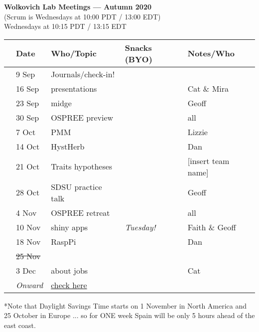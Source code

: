 \documentclass[11pt]{article}
\begin{document}
 
\raggedright
{}

\begin{center} 
{\large \textbf{Wolkovich Lab Meetings --- Autumn 2020}} \\ [2pt]
(Scrum is Wednesdays at 10:00 PDT / 13:00 EDT)\\
Wednesdays at 10:15 PDT / 13:15 EDT \\
\end{center} 

\begin{center}
\begin{tabular}{ p{0.2 cm}  p{2 cm}  p{5 cm}  p{2 cm}  p{4 cm} }  \hline \hline
 & \textbf{Date}
   & \textbf{Who/Topic}
      & \textbf{Snacks (BYO)} 
         & \textbf{Notes/Who} \\ 
\hline \hline
 & 9 Sep & Journals/check-in! &       &  \\\hline
 & 16 Sep & presentations &  & Cat \& Mira\\\hline
 & 23 Sep & midge &      & Geoff \\\hline  
 & 30 Sep &  OSPREE preview &       & all  \\\hline
 & 7 Oct & PMM  &       &   Lizzie\\\hline
 & 14 Oct & HystHerb &       &  Dan \\\hline
 & 21 Oct &  Traits hypotheses &       & [insert team name]   \\\hline
 & 28 Oct & SDSU practice talk &       & Geoff \\\hline
 & 4 Nov &  OSPREE retreat &       &   all \\\hline
 & 10 Nov &  shiny apps & \emph{Tuesday!}      & Faith \& Geoff \\\hline
 & 18 Nov & RaspPi &       &  Dan \\\hline
 & \sout{25 Nov} &  &       &   \\\hline
 & 3 Dec & about jobs  &       & Cat  \\\hline
 & \emph{Onward} & \href{https://github.com/temporalecologylab/labgit/wiki/Current-lab-meeting-schedule}{check here}&    & \\\hline

\hline
\end{tabular}
\end{center}
*Note that Daylight Savings Time starts on 1 November in North America and 25 October in Europe ... so for ONE week Spain will be only 5 hours ahead of the east coast.\\
\end{document}
